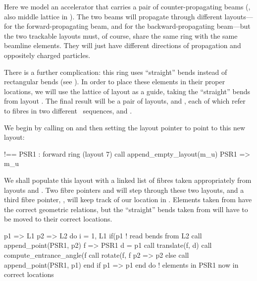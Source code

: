 %
Here we model an accelerator that carries a pair of
counter-propagating beams (, also middle
lattice in ). The two beams will propagate
through different layouts--- for the forward-propagating
beam, and  for the backward-propagating beam---but
the two trackable layouts must, of course, share the same ring
with the same beamline elements. They will just have different
directions of propagation and oppositely charged particles.

There is a further complication: this ring uses ``straight'' bends
instead of rectangular bends (see ). In order to
place these elements in their proper locations, we will use the
lattice of layout  as a guide, taking the ``straight''
bends from layout .%
The final result will be a pair of layouts,  and
, each of which refer to fibres in two different
\DNA\ sequences,  and .

%
We begin by calling  on  and then
setting the layout pointer  to point to this new layout:
%
\begin{ptccode}
!== PSR1 : forward ring  (layout 7)
call append_empty_layout(m_u)
PSR1 => m_u%
\end{ptccode}
%
We shall populate this layout with a linked list of fibres taken
appropriately from layouts  and . Two fibre
pointers  and  will step through these two layouts,
and a third fibre pointer, , will keep track of our location
in . Elements taken from  have the correct
geometric relations, but the ``straight'' bends taken from 
will have to be moved to their correct locations.

\begin{ptccode}
p1 => L1%
p2 => L2%
do i = 1, L1%
  if(p1%
    ! read bends from L2
    call append_point(PSR1, p2)    \label{lin:psr1.append.L2}
    f => PSR1%
    d = p1%
    call translate(f, d)           \label{lin:psr1.trans.d}
    call compute_entrance_angle(f%
    call rotate(f, f%
    p2 => p2%
  else
    call append_point(PSR1, p1)    \label{lin:psr1.append.L1}
  end if
  p1 => p1%
end do ! elements in PSR1 now in correct locations
\end{ptccode}

